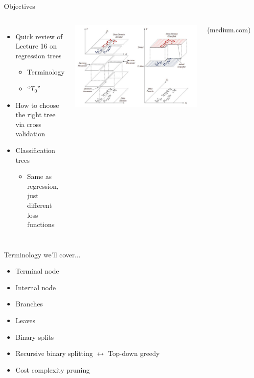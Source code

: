 \documentclass[mathserif, aspectratio=169]{beamer}
\begin{document}
\begin{frame}{Objectives}
\begin{columns}
\begin{itemize}
\item Quick review of Lecture 16 on regression trees
\begin{itemize}
\item Terminology
\item ``$T_0$''
\end{itemize}
\item How to choose the right tree via cross validation
\item Classification trees
\begin{itemize}
\item Same as regression, just different loss functions
\end{itemize}
\end{itemize}


\includegraphics[width=\textwidth]{RTree_image}

{\tiny (medium.com)}
\end{columns}


\end{frame}



\begin{frame}{Terminology we'll cover...}
	\begin{itemize}
		\item Terminal node
		\item Internal node
		\item Branches
		\item Leaves
		\item Binary splits
		\item Recursive binary splitting $\leftrightarrow$ Top-down greedy 
		\item Cost complexity pruning
	\end{itemize}
\end{frame}
\end{document}
